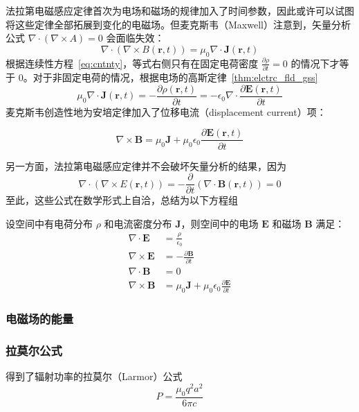 \documentclass[cn,10pt,math=newtx,citestyle=gb7714-2015,bibstyle=gb7714-2015]{elegantbook}
\def\bm{\boldsymbol}
\def\p{\partial}
\begin{document}
法拉第电磁感应定律首次为电场和磁场的规律加入了时间参数，因此或许可以试图将这些定律全部拓展到变化的电磁场。但麦克斯韦（Maxwell）注意到，矢量分析公式 $\nabla\cdot(\nabla\times A)=0$ 会面临失效：
\begin{equation*}
    \nabla\cdot(\nabla\times B(\bm r,t)) = \mu_0\nabla\cdot\bm J(\bm r,t)
\end{equation*}
根据连续性方程~\ref{eq:cntnty}，等式右侧只有在固定电荷密度 $\frac{\p\rho}{\p t}=0$ 的情况下才等于 0。对于非固定电荷的情况，根据电场的高斯定律~\ref{thm:elctrc_fld_gss}
\begin{equation*}
    \mu_0\nabla\cdot\bm J(\bm r,t) = -\frac{\p\rho(\bm r,t)}{\p t} = -\epsilon_0\nabla\cdot\frac{\p\bm E(\bm r,t)}{\p t}
\end{equation*}
麦克斯韦创造性地为安培定律加入了位移电流（displacement current）项：

\begin{theorem}
    \begin{equation*}
        \nabla\times\bm B=\mu_0\bm J+\mu_0\epsilon_0\frac{\p\bm E(\bm r,t)}{\p t}
    \end{equation*}
\end{theorem}

另一方面，法拉第电磁感应定律并不会破坏矢量分析的结果，因为
\begin{equation*}
    \nabla\cdot(\nabla\times E(\bm r,t)) = -\frac{\p}{\p t}(\nabla\cdot\bm B(\bm r,t))=0
\end{equation*}
至此，这些公式在数学形式上自洽，总结为以下方程组

\begin{theorem}
    设空间中有电荷分布 $\rho$ 和电流密度分布 $\bm J$，则空间中的电场 $\bm E$ 和磁场 $\bm B$ 满足：
    \begin{align*}
        \nabla\cdot\bm E & =\frac{\rho}{\epsilon_0}\\
        \nabla\times\bm E & = -\frac{\p\bm B}{\p t}\\
        \nabla\cdot\bm B & =0\\
        \nabla\times\bm B & =\mu_0\bm J+\mu_0\epsilon_0\frac{\p\bm E}{\p t}
    \end{align*}
\end{theorem}

\subsubsection{电磁场的能量}

\iffalse
\subsubsection{拉莫尔公式}
得到了辐射功率的拉莫尔（Larmor）公式
\begin{equation*}
    P=\frac{\mu_0q^2a^2}{6\pi c}
\end{equation*}
\end{document}
